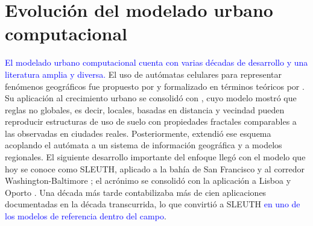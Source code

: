 \begin{resumen}




\end{resumen}


\section{Evolución del modelado urbano computacional}
\label{sec:evolucion}

\textcolor{blue}{El modelado urbano computacional cuenta con varias décadas de
desarrollo y una literatura amplia y diversa.} El uso de autómatas celulares
para representar fenómenos geográficos fue propuesto por
\textcite{Tobler1979} y formalizado en términos teóricos por
\textcite{Couclelis1985}. Su aplicación al crecimiento urbano se consolidó con
\textcite{White1993}, cuyo modelo mostró que reglas no globales, es decir,
locales, basadas en distancia y vecindad pueden reproducir estructuras de uso de
suelo con propiedades fractales comparables a las observadas en ciudades
reales. Posteriormente, \textcite{White1997} extendió ese esquema acoplando el
autómata a un sistema de información geográfica y a modelos regionales. El
siguiente desarrollo importante del enfoque llegó con el modelo que hoy se
conoce como SLEUTH, aplicado a la bahía de San Francisco y al corredor
Washington-Baltimore \parencite{ClarkeHoppen1997,Clarke1998}; el acrónimo se
consolidó con la aplicación a Lisboa y Oporto \parencite{Silva2002}. Una
década más tarde \textcite{Clarke2008} contabilizaba más de cien aplicaciones
documentadas en la década transcurrida, lo que convirtió a SLEUTH
\textcolor{blue}{en uno de los modelos de referencia dentro del campo}.

